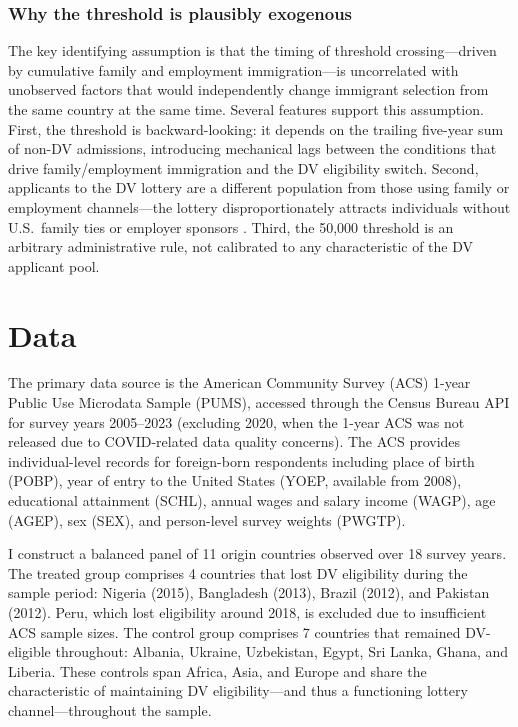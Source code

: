 \documentclass[12pt]{article}
\begin{document}
\subsubsection*{Why the threshold is plausibly exogenous} The key identifying assumption is that the timing of threshold crossing---driven by cumulative family and employment immigration---is uncorrelated with unobserved factors that would independently change immigrant selection from the same country at the same time. Several features support this assumption. First, the threshold is backward-looking: it depends on the trailing five-year sum of non-DV admissions, introducing mechanical lags between the conditions that drive family/employment immigration and the DV eligibility switch. Second, applicants to the DV lottery are a different population from those using family or employment channels---the lottery disproportionately attracts individuals without U.S.\ family ties or employer sponsors \citep{Orrenius2020}. Third, the 50,000 threshold is an arbitrary administrative rule, not calibrated to any characteristic of the DV applicant pool.

\section{Data}

The primary data source is the American Community Survey (ACS) 1-year Public Use Microdata Sample (PUMS), accessed through the Census Bureau API for survey years 2005--2023 (excluding 2020, when the 1-year ACS was not released due to COVID-related data quality concerns). The ACS provides individual-level records for foreign-born respondents including place of birth (POBP), year of entry to the United States (YOEP, available from 2008), educational attainment (SCHL), annual wages and salary income (WAGP), age (AGEP), sex (SEX), and person-level survey weights (PWGTP).

I construct a balanced panel of 11 origin countries observed over 18 survey years. The treated group comprises 4 countries that lost DV eligibility during the sample period: Nigeria (2015), Bangladesh (2013), Brazil (2012), and Pakistan (2012). Peru, which lost eligibility around 2018, is excluded due to insufficient ACS sample sizes. The control group comprises 7 countries that remained DV-eligible throughout: Albania, Ukraine, Uzbekistan, Egypt, Sri Lanka, Ghana, and Liberia. These controls span Africa, Asia, and Europe and share the characteristic of maintaining DV eligibility---and thus a functioning lottery channel---throughout the sample.
\end{document}
